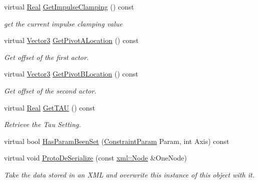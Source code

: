 \begin{DoxyCompactItemize}
virtual \hyperlink{namespaceMezzanine_a726731b1a7df72bf3583e4a97282c6f6}{Real} \hyperlink{classMezzanine_1_1Point2PointConstraint_aa2d314fd48f4623393d4c981f2200bcd}{GetImpulseClamping} () const 
\begin{DoxyCompactList}\small\item\em get the current impulse clamping value \item\end{DoxyCompactList}\item 
virtual \hyperlink{classMezzanine_1_1Vector3}{Vector3} \hyperlink{classMezzanine_1_1Point2PointConstraint_a975132636767ba41ef2eb277467d9bee}{GetPivotALocation} () const 
\begin{DoxyCompactList}\small\item\em Get offset of the first actor. \item\end{DoxyCompactList}\item 
virtual \hyperlink{classMezzanine_1_1Vector3}{Vector3} \hyperlink{classMezzanine_1_1Point2PointConstraint_a7d8ad35c958e6867cb7259940b803431}{GetPivotBLocation} () const 
\begin{DoxyCompactList}\small\item\em Get offset of the second actor. \item\end{DoxyCompactList}\item 
virtual \hyperlink{namespaceMezzanine_a726731b1a7df72bf3583e4a97282c6f6}{Real} \hyperlink{classMezzanine_1_1Point2PointConstraint_a2cecb3691f656ca1a9c8d57987e6c926}{GetTAU} () const 
\begin{DoxyCompactList}\small\item\em Retrieve the Tau Setting. \item\end{DoxyCompactList}\item 
virtual bool \hyperlink{classMezzanine_1_1Point2PointConstraint_a658027a5d0f5774a92a279485ccfe29d}{HasParamBeenSet} (\hyperlink{namespaceMezzanine_a6c62e8c2938fb203eb7a7072c12176f4}{ConstraintParam} Param, int Axis) const 
\item 
virtual void \hyperlink{classMezzanine_1_1Point2PointConstraint_a1a5ae4370aa77dc4a07686a95e8c20bc}{ProtoDeSerialize} (const \hyperlink{classMezzanine_1_1xml_1_1Node}{xml::Node} \&OneNode)
\begin{DoxyCompactList}\small\item\em Take the data stored in an XML and overwrite this instance of this object with it. \item\end{DoxyCompactList}\item 

\end{DoxyCompactItemize}
